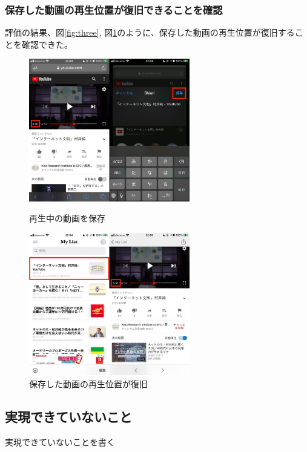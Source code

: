 \documentclass[a4j,10pt]{jsarticle}
\begin{document}
\subsubsection{保存した動画の再生位置が復旧できることを確認}
評価の結果、図\ref{fig:three}, 図\ref{fig:four}のように、保存した動画の再生位置が復旧することを確認できた。
\begin{figure}[htbp]
    \begin{minipage}{0.5\hsize}
        \begin{center}
        \includegraphics[width=70mm]{../assets/playback_position/playback_position1.png}
        \end{center}
        \caption{再生中の動画を保存}
        \label{fig:three}
    \end{minipage}
    \begin{minipage}{0.5\hsize}
        \begin{center}
        \includegraphics[width=70mm]{../assets/playback_position/playback_position2.png}
        \end{center}
        \caption{保存した動画の再生位置が復旧}
        \label{fig:four}
    \end{minipage}
\end{figure}

\subsection{実現できていないこと}
実現できていないことを書く



\end{document}
